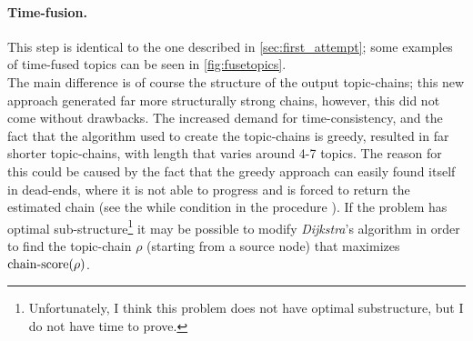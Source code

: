 \paragraph{\textbf{Time-fusion.}} This step is identical to the one described in \cref{sec:first_attempt}; some examples of time-fused topics can be seen in \cref{fig:fusetopics}.\\
The main difference is of course the structure of the output topic-chains; this new approach generated far more structurally strong chains, however, this did not come without drawbacks. The increased demand for time-consistency, and the fact that the algorithm used to create the topic-chains is greedy, resulted in far shorter topic-chains, with length that varies around 4-7 topics. The reason for this could be caused by the fact that the greedy approach can easily found itself in dead-ends, where it is not able to progress and is forced to return the estimated chain (see the while condition in the procedure \CandidateChain{}). If the problem has optimal sub-structure\footnote{Unfortunately, I think this problem does not have optimal substructure, but I do not have  time to prove.} it may be possible to modify \textit{Dijkstra}'s algorithm in order to find the topic-chain $\rho$ (starting from a source node) that maximizes $\mathop{\mathrm{chain\text{-}score}}(\rho)$. 
